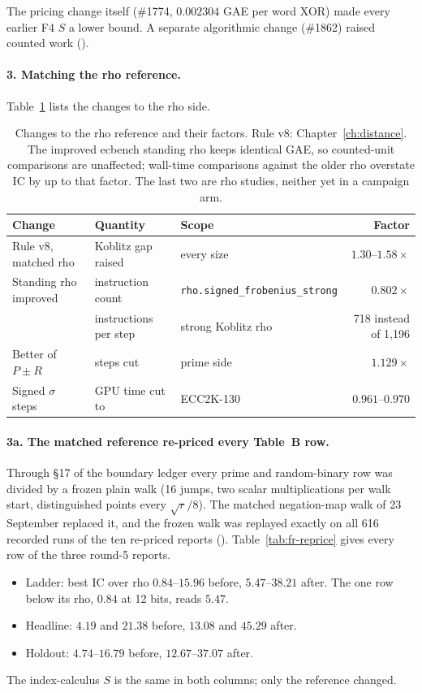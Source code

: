 The pricing change itself (\#1774, $0.002304$ GAE per word XOR) made every
earlier F4 $S$ a lower bound. A separate algorithmic change (\#1862) raised
counted work ().

\paragraph{3. Matching the rho reference.} Table~\ref{tab:audit-rho} lists
the changes to the rho side.

\begin{table}[t]
\centering\small
\begin{tabular}{@{}lllr@{}}
\toprule
Change & Quantity & Scope & Factor \\
\midrule
Rule v8, matched rho & Koblitz gap raised & every size & $1.30$--$1.58\times$ \\
Standing rho improved & instruction count & \texttt{rho.signed\_frobenius\_strong} & $0.802\times$ \\
 & instructions per step & strong Koblitz rho & 718 instead of 1{,}196 \\
Better of $P\pm R$ & steps cut & prime side & $1.129\times$ \\
Signed $\sigma$ steps & GPU time cut to & ECC2K-130 & $0.961$--$0.970$ \\
\bottomrule
\end{tabular}
\caption[]{Changes to the rho reference and their factors. Rule v8:
Chapter~\ref{ch:distance}. The improved ecbench standing rho keeps
identical GAE, so counted-unit comparisons are unaffected; wall-time
comparisons against the older rho overstate IC by up to that factor. The
last two are rho studies, neither yet in a campaign arm.}
\label{tab:audit-rho}
\end{table}

\paragraph{3a. The matched reference re-priced every Table~B row.}
Through \S17 of the boundary ledger every prime and random-binary row was
divided by a frozen plain walk (16 jumps, two scalar multiplications per
walk start, distinguished points every $\sqrt r/8$). The matched
negation-map walk of 23 September replaced it, and the frozen walk was
replayed exactly on all 616 recorded runs of the ten re-priced reports
().
Table~\ref{tab:fr-reprice} gives every row of the three round-5 reports.
\begin{itemize}
\item Ladder: best IC over rho $0.84$--$15.96$ before, $5.47$--$38.21$
  after. The one row below its rho, $0.84$ at 12 bits, reads $5.47$.
\item Headline: $4.19$ and $21.38$ before, $13.08$ and $45.29$ after.
\item Holdout: $4.74$--$16.79$ before, $12.67$--$37.07$ after.
\end{itemize}
The index-calculus $S$ is the same in both columns; only the reference
changed.

